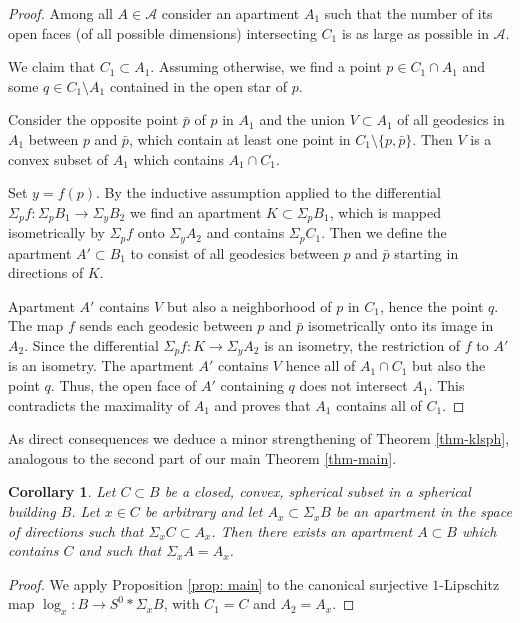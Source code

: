 \documentclass[12pt,leqno]{amsart}
\numberwithin{equation}{section}
\newtheorem{cor}[thm]{Corollary}
\theoremstyle{definition}
\theoremstyle{remark}
\begin{document}
\begin{proof}
	
	Among all $A\in \mathcal A$ consider an apartment  $A_1$ such that the number of its open faces (of all possible dimensions) 
	 intersecting $C_1$ is as large as possible in $\mathcal A$.

We claim that $C_1\subset A_1$.  Assuming otherwise, we find a point $p\in C_1 \cap A_1$ and some $q\in C_1\setminus A_1$ contained in the open star of $p$.  



Consider the opposite point $\bar p$ of $p$ in $A_1$ and the union $V\subset A_1$ of all geodesics in $A_1$ between $p$ and $\bar p$, which contain at least one  point in $C_1 \setminus \{p, \bar p\}$.  Then $V$   is  a convex  subset of $A_1$ which contains $A_1\cap C_1$.


Set $y=f(p)$.
By the inductive assumption applied to the differential $\Sigma _p f:\Sigma _p B_1  \to \Sigma _y B_2$ we find an apartment 
$K\subset \Sigma _p B_1$, which is mapped isometrically by $\Sigma _p f$  onto $\Sigma _{y} A_2$ and contains $\Sigma _p C_1$.  Then we define the  apartment $A'\subset B_1$ to consist of all geodesics between $p$ and $\bar p$ starting in directions of $K$.

Apartment $A'$ contains $V$ but also a neighborhood of $p$ in $C_1$, hence the point $q$.    The map $f$ sends each geodesic between $p$ and $\bar p$ isometrically onto its image in $A_2$. Since the differential $\Sigma_pf:K\to \Sigma _y A_2$ is  an isometry, the restriction of $f$ to $A'$ is an isometry. The apartment $A'$ contains $V$ hence all of $A_1\cap C_1$ but also the point $q$.
  Thus, the open face of $A'$ containing 
$q$ does not intersect  $A_1$. This contradicts the maximality of $A_1$ and proves that $A_1$ contains all of $C_1$.	
	\end{proof}
	
	
As direct consequences we deduce a minor strengthening of Theorem \ref{thm-klsph}, analogous to the second part of our main Theorem \ref{thm-main}.

\begin{cor}
Let $C\subset B$ be a closed, convex, spherical subset in a spherical building $B$. Let $x\in C$ be arbitrary and let $A_x\subset \Sigma _x B$ be an apartment in the space of directions such that $\Sigma _xC\subset A_x$.  Then there exists an apartment $A\subset B$ which contains $C$ and such that $\Sigma _xA=A_x$.
\end{cor}
 
\begin{proof}
We apply Proposition \ref{prop: main} to  the canonical surjective $1$-Lipschitz map $\log_x :B\to  S^{0} * \Sigma _x B$,  with $C_1=C$ and $A_2=A_x$.
\end{proof}
\end{document}
